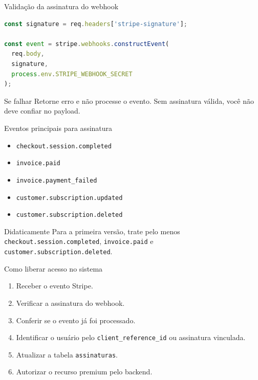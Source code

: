 \documentclass[aspectratio=169]{beamer}
\newcommand{\code}[1]{\texttt{#1}}
\begin{document}
\begin{frame}[fragile]{Validação da assinatura do webhook}
\begin{lstlisting}[language=JavaScript]
const signature = req.headers['stripe-signature'];

const event = stripe.webhooks.constructEvent(
  req.body,
  signature,
  process.env.STRIPE_WEBHOOK_SECRET
);
\end{lstlisting}

\begin{exampleblock}{Se falhar}
Retorne erro e não processe o evento. Sem assinatura válida, você não deve confiar no payload.
\end{exampleblock}
\end{frame}

\begin{frame}{Eventos principais para assinatura}
\begin{itemize}
  \item \code{checkout.session.completed}
  \item \code{invoice.paid}
  \item \code{invoice.payment\_failed}
  \item \code{customer.subscription.updated}
  \item \code{customer.subscription.deleted}
\end{itemize}

\begin{block}{Didaticamente}
Para a primeira versão, trate pelo menos \code{checkout.session.completed}, \code{invoice.paid} e \code{customer.subscription.deleted}.
\end{block}
\end{frame}

\begin{frame}{Como liberar acesso no sistema}
\begin{enumerate}
  \item Receber o evento Stripe.
  \item Verificar a assinatura do webhook.
  \item Conferir se o evento já foi processado.
  \item Identificar o usuário pelo \code{client\_reference\_id} ou assinatura vinculada.
  \item Atualizar a tabela \code{assinaturas}.
  \item Autorizar o recurso premium pelo backend.
\end{enumerate}
\end{frame}
\end{document}
